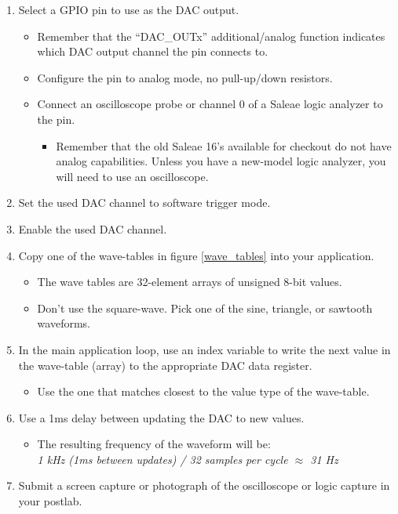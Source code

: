 \documentclass[11pt,fleqn]{book} %
\begin{document}
\begin{enumerate}
    \item Select a GPIO pin to use as the DAC output.
    \begin{itemize}
        \item Remember that the ``DAC\_OUTx'' additional/analog function indicates which DAC output channel the pin connects to. 
        \item Configure the pin to analog mode, no pull-up/down resistors.
        \item Connect an oscilloscope probe or channel 0 of a Saleae logic analyzer to the pin.
        \begin{itemize}
            \item Remember that the old Saleae 16's available for checkout do not have analog capabilities. Unless you have a new-model logic analyzer, you will need to use an oscilloscope. 
        \end{itemize}    
    \end{itemize}
    \item Set the used DAC channel to software trigger mode. 
    \item Enable the used DAC channel. 
    \item Copy one of the wave-tables in figure \ref{wave_tables} into your application. 
    \begin{itemize}
        \item The wave tables are 32-element arrays of unsigned 8-bit values.
        \item Don't use the square-wave. Pick one of the sine, triangle, or sawtooth waveforms. 
    \end{itemize}
    \item In the main application loop, use an index variable to write the next value in the wave-table (array) to the appropriate DAC data register. 
    \begin{itemize}
        \item Use the one that matches closest to the value type of the wave-table.
    \end{itemize}
    \item Use a 1ms delay between updating the DAC to new values. 
    \begin{itemize}
        \item The resulting frequency of the waveform will be: \\ \textit{1 kHz (1ms between updates) / 32 samples per cycle $\approx$ 31 Hz}
    \end{itemize}
    \item Submit a screen capture or photograph of the oscilloscope or logic capture in your postlab.
\end{enumerate}
\end{document}
